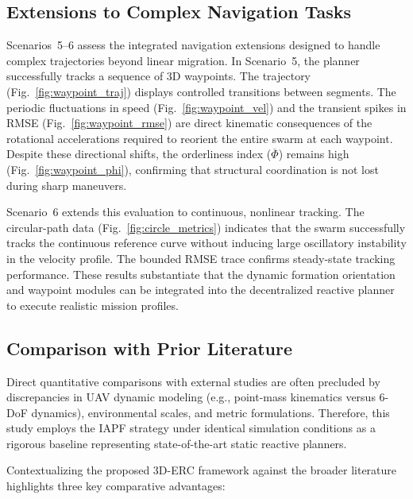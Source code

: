 \documentclass[pdflatex,sn-basic]{sn-jnl}%
\begin{document}
    \subsection{Extensions to Complex Navigation Tasks} \label{sec:analysis_extensions}

        Scenarios~5--6 assess the integrated navigation extensions designed to handle complex trajectories beyond linear migration. In Scenario~5, the planner successfully tracks a sequence of 3D waypoints. The trajectory (Fig.~\ref{fig:waypoint_traj}) displays controlled transitions between segments. The periodic fluctuations in speed (Fig.~\ref{fig:waypoint_vel}) and the transient spikes in RMSE (Fig.~\ref{fig:waypoint_rmse}) are direct kinematic consequences of the rotational accelerations required to reorient the entire swarm at each waypoint. Despite these directional shifts, the orderliness index ($\overline{\Phi}$) remains high (Fig.~\ref{fig:waypoint_phi}), confirming that structural coordination is not lost during sharp maneuvers.

        Scenario~6 extends this evaluation to continuous, nonlinear tracking. The circular-path data (Fig.~\ref{fig:circle_metrics}) indicates that the swarm successfully tracks the continuous reference curve without inducing large oscillatory instability in the velocity profile. The bounded RMSE trace confirms steady-state tracking performance. These results substantiate that the dynamic formation orientation and waypoint modules can be integrated into the decentralized reactive planner to execute realistic mission profiles.

    \subsection{Comparison with Prior Literature} \label{sec:comparison_literature}

        Direct quantitative comparisons with external studies are often precluded by discrepancies in UAV dynamic modeling (e.g., point-mass kinematics versus 6-DoF dynamics), environmental scales, and metric formulations. Therefore, this study employs the IAPF strategy \citep{wang_uav_2021, prabaswara_collision-free_2025} under identical simulation conditions as a rigorous baseline representing state-of-the-art static reactive planners.

        Contextualizing the proposed 3D-ERC framework against the broader literature highlights three key comparative advantages:
\end{document}
